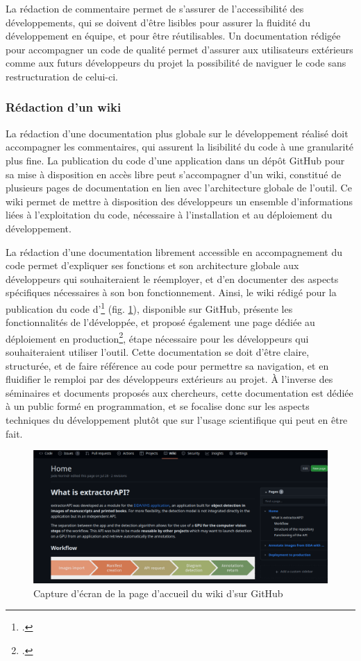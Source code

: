 	La rédaction de commentaire permet de s'assurer de l'accessibilité des développements, qui se doivent d'être lisibles pour assurer la fluidité du développement en équipe, et pour être réutilisables. Un documentation rédigée pour accompagner un code de qualité permet d'assurer aux utilisateurs extérieurs comme aux futurs développeurs du projet la possibilité de naviguer le code sans restructuration de celui-ci.

    \subsubsection{Rédaction d'un wiki}
    La rédaction d'une documentation plus globale sur le développement réalisé doit accompagner les commentaires, qui assurent la lisibilité du code à une granularité plus fine. La publication du code d'une application dans un dépôt GitHub pour sa mise à disposition en accès libre peut s'accompagner d'un wiki, constitué de plusieurs pages de documentation en lien avec l'architecture globale de l'outil. Ce wiki permet de mettre à disposition des développeurs un ensemble d'informations liées à l'exploitation du code, nécessaire à l'installation et au déploiement du développement.
    
    La rédaction d'une documentation librement accessible en accompagnement du code permet d'expliquer ses fonctions et son architecture globale aux développeurs qui souhaiteraient le réemployer, et d'en documenter des aspects spécifiques nécessaires à son bon fonctionnement. Ainsi, le wiki rédigé pour la publication du code d'\exapi\footcite{Homea} (fig. \ref{fig:exapi_wiki}), disponible sur GitHub, présente les fonctionnalités de l'\api développée, et proposé également une page dédiée au déploiement en production\footcite{DeploymentProduction}, étape nécessaire pour les développeurs qui souhaiteraient utiliser l'outil. Cette documentation se doit d'être claire, structurée, et de faire référence au code pour permettre sa navigation, et en fluidifier le remploi par des développeurs extérieurs au projet. À l'inverse des séminaires et documents proposés aux chercheurs, cette documentation est dédiée à un public formé en programmation, et se focalise donc sur les aspects techniques du développement plutôt que sur l'usage scientifique qui peut en être fait.
    
    \begin{figure}[h]
    	\centering
    	\includegraphics[width=15cm]{images/exapi_wiki.png}
    	\caption{Capture d'écran de la page d'accueil du wiki d'\exapi sur GitHub}
    	\label{fig:exapi_wiki}
    \end{figure}


